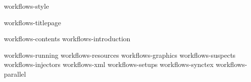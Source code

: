 %
%


\environment workflows-style

\startdocument
  [metadata:author=Hans Hagen,
   metadata:title=Workflow support in context,
   author=Hans Hagen,
   affiliation=PRAGMA ADE,
   location=Hasselt NL,
   title=workflow,
   extra=support in context,
   support=www.contextgarden.net,
   website=www.pragma-ade.nl]

\component workflows-titlepage

\startfrontmatter
    \component workflows-contents
    \component workflows-introduction
\stopfrontmatter

\startbodymatter
    \component workflows-running
    \component workflows-resources
    \component workflows-graphics
    \component workflows-suspects
    \component workflows-injectors
    \component workflows-xml
    \component workflows-setups
    \component workflows-synctex
    \component workflows-parallel
\stopbodymatter

\stopdocument
